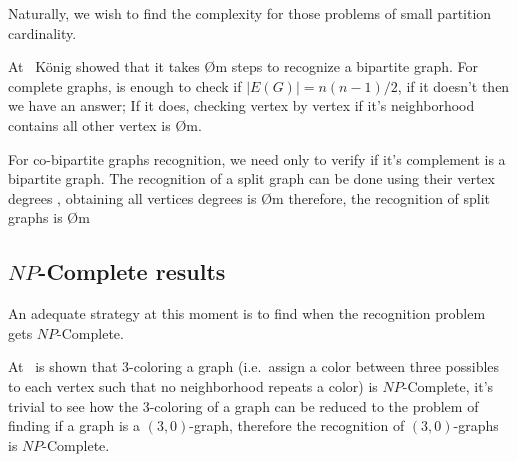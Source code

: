 Naturally, we wish to find the complexity for those problems of small partition cardinality.

At~\cite{konig36} König showed that it takes \O{m} steps to recognize a bipartite graph.
For complete graphs, is enough to check if $|E(G)|=n(n-1)/2$, if it doesn't then we have an answer;
If it does, checking vertex by vertex if it's neighborhood contains all other vertex is \O{m}.

For co-bipartite graphs recognition, we need only to verify if it's complement is a bipartite graph.
The recognition of a split graph can be done using their vertex degrees , obtaining all vertices degrees is \O{m} therefore, the recognition of split graphs is \O{m}

\subsection{$NP$-Complete results}\label{subsec:np-complete-results}

An adequate strategy at this moment is to find when the recognition problem gets $NP$-Complete.

At~\cite{gareyjohnson} is shown that 3-coloring a graph (i.e.\ assign a color between three possibles to each vertex such that no neighborhood repeats a color) is $NP$-Complete,
it's trivial to see how the 3-coloring of a graph can be reduced to the problem of finding if a graph is a $(3,0)$-graph,
therefore the recognition of $(3,0)$-graphs is $NP$-Complete.

